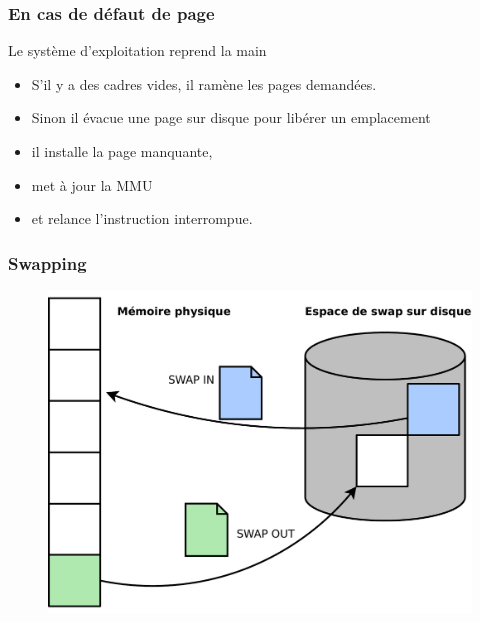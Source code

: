 \begin{frame}
  \frametitle{En cas de défaut de page}
  Le système d'exploitation reprend la main 
  \begin{itemize}
  \item S'il y a des cadres vides, il ramène les pages demandées. 
  \item Sinon il évacue une page sur disque pour libérer un emplacement
    \vspace{0.5cm}
  \item il installe la page manquante, 
  \item met à jour la MMU
  \item et relance l'instruction interrompue.
  \end{itemize}
\end{frame}


\begin{frame}
  \frametitle{Swapping}
  \begin{figure}
    \includegraphics[width=0.8\linewidth]{fig2/swapping}
  \end{figure}
\end{frame}

